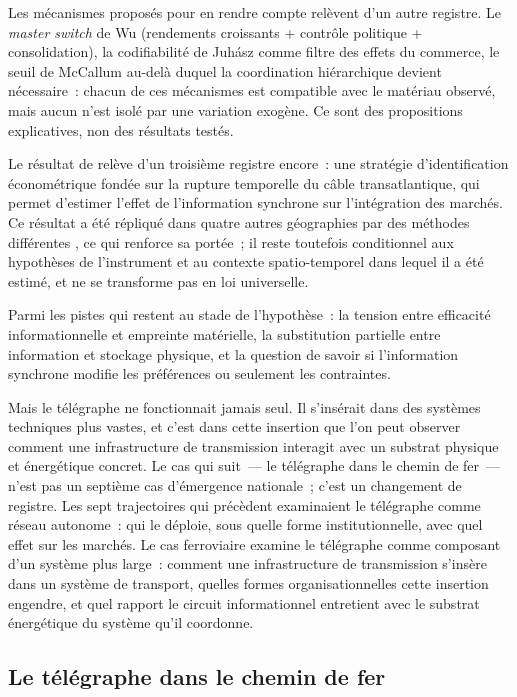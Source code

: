 Les mécanismes proposés pour en rendre compte relèvent d'un autre registre. Le \emph{master switch} de Wu (rendements croissants + contrôle politique + consolidation), la codifiabilité de Juhász comme filtre des effets du commerce, le seuil de McCallum au-delà duquel la coordination hiérarchique devient nécessaire~: chacun de ces mécanismes est compatible avec le matériau observé, mais aucun n'est isolé par une variation exogène. Ce sont des propositions explicatives, non des résultats testés.

Le résultat de \textcite{steinwender_real_2018} relève d'un troisième registre encore~: une stratégie d'identification économétrique fondée sur la rupture temporelle du câble transatlantique, qui permet d'estimer l'effet de l'information synchrone sur l'intégration des marchés. Ce résultat a été répliqué dans quatre autres géographies par des méthodes différentes \parencite{ejrnaes_gains_2010, hao_wiring_2022, andrabi_information_2021, gao_communication_2021}, ce qui renforce sa portée~; il reste toutefois conditionnel aux hypothèses de l'instrument et au contexte spatio-temporel dans lequel il a été estimé, et ne se transforme pas en loi universelle.

Parmi les pistes qui restent au stade de l'hypothèse~: la tension entre efficacité informationnelle et empreinte matérielle, la substitution partielle entre information et stockage physique, et la question de savoir si l'information synchrone modifie les préférences ou seulement les contraintes.

Mais le télégraphe ne fonctionnait jamais seul. Il s'insérait dans des systèmes techniques plus vastes, et c'est dans cette insertion que l'on peut observer comment une infrastructure de transmission interagit avec un substrat physique et énergétique concret. Le cas qui suit~--- le télégraphe dans le chemin de fer~--- n'est pas un septième cas d'émergence nationale~; c'est un changement de registre. Les sept trajectoires qui précèdent examinaient le télégraphe comme réseau autonome~: qui le déploie, sous quelle forme institutionnelle, avec quel effet sur les marchés. Le cas ferroviaire examine le télégraphe comme composant d'un système plus large~: comment une infrastructure de transmission s'insère dans un système de transport, quelles formes organisationnelles cette insertion engendre, et quel rapport le circuit informationnel entretient avec le substrat énergétique du système qu'il coordonne.


\subsection*{Le télégraphe dans le chemin de fer}\label{subsec:railroad}

